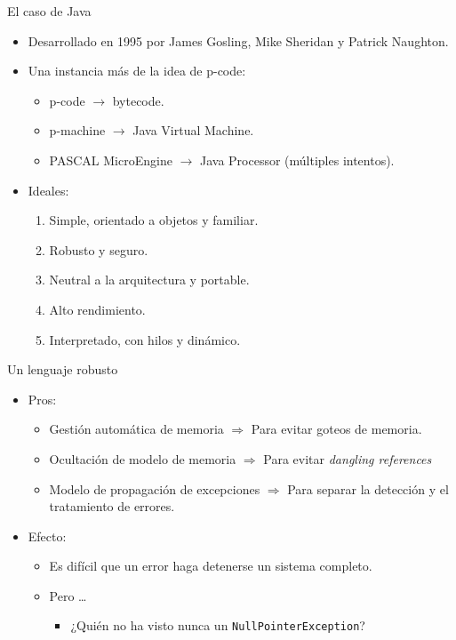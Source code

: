 \begin{frame}[t]{El caso de Java}
  \begin{itemize}
    \item Desarrollado en 1995 por James Gosling, Mike Sheridan y Patrick Naughton.
    \item Una instancia más de la idea de p-code:
      \begin{itemize}
        \item p-code $\rightarrow$ bytecode.
        \item p-machine $\rightarrow$ Java Virtual Machine.
        \item PASCAL MicroEngine $\rightarrow$ Java Processor (múltiples intentos).
      \end{itemize}
    \item Ideales:
      \begin{enumerate}
        \item Simple, orientado a objetos y familiar.
        \item Robusto y seguro.
        \item Neutral a la arquitectura y portable.
        \item Alto rendimiento.
        \item Interpretado, con hilos y dinámico.
      \end{enumerate}
  \end{itemize}
\end{frame}


\begin{frame}[t]{Un lenguaje robusto}
  \begin{itemize}
    \item Pros:
      \begin{itemize}
        \item Gestión automática de memoria $\Rightarrow$ Para evitar goteos de memoria.
        \item Ocultación de modelo de memoria $\Rightarrow$ Para evitar \emph{dangling references}
        \item Modelo de propagación de excepciones $\Rightarrow$ Para separar la detección y el tratamiento de errores.
      \end{itemize}
    \item Efecto:
      \begin{itemize}
        \item Es difícil que un error haga detenerse un sistema completo.
        \item Pero \ldots
          \begin{itemize}
            \item ¿Quién no ha visto nunca un \texttt{NullPointerException}?
          \end{itemize}
      \end{itemize}
  \end{itemize}
\end{frame}


